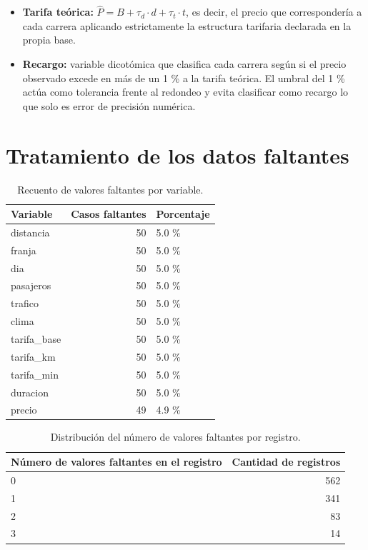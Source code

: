 \documentclass[
]{book}
\providecommand{\tightlist}{%
  \setlength{\itemsep}{0pt}\setlength{\parskip}{0pt}}
\begin{document}
\begin{itemize}
\tightlist
\item
  \textbf{Tarifa teórica:} \(\hat{P} = B + \tau_d \cdot d + \tau_t \cdot t\), es decir, el precio que
  correspondería a cada carrera aplicando estrictamente la estructura tarifaria declarada en
  la propia base.
\item
  \textbf{Recargo:} variable dicotómica que clasifica cada carrera según si el precio observado
  excede en más de un 1 \% a la tarifa teórica. El umbral del 1 \% actúa como tolerancia frente
  al redondeo y evita clasificar como recargo lo que solo es error de precisión numérica.
\end{itemize}

\section{Tratamiento de los datos faltantes}\label{tratamiento-de-los-datos-faltantes}

\begin{table}

\caption{\label{tab:tabla-faltantes}Recuento de valores faltantes por variable.}
\centering
\begin{tabular}[t]{l|r|l}
\hline
Variable & Casos faltantes & Porcentaje\\
\hline
distancia & 50 & 5.0 \%\\
\hline
franja & 50 & 5.0 \%\\
\hline
dia & 50 & 5.0 \%\\
\hline
pasajeros & 50 & 5.0 \%\\
\hline
trafico & 50 & 5.0 \%\\
\hline
clima & 50 & 5.0 \%\\
\hline
tarifa\_base & 50 & 5.0 \%\\
\hline
tarifa\_km & 50 & 5.0 \%\\
\hline
tarifa\_min & 50 & 5.0 \%\\
\hline
duracion & 50 & 5.0 \%\\
\hline
precio & 49 & 4.9 \%\\
\hline
\end{tabular}
\end{table}

\begin{table}

\caption{\label{tab:tabla-faltantes}Distribución del número de valores faltantes por registro.}
\centering
\begin{tabular}[t]{l|r}
\hline
Número de valores faltantes en el registro & Cantidad de registros\\
\hline
0 & 562\\
\hline
1 & 341\\
\hline
2 & 83\\
\hline
3 & 14\\
\hline
\end{tabular}
\end{table}
\end{document}
